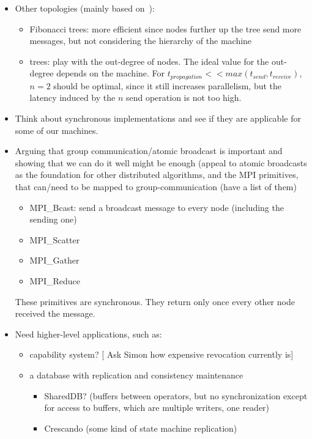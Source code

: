 \documentclass{article}
\newcommand{\stefan}[1]{
  {\color{skRed}[{\color{red}{SK}} #1]}}
\begin{document}
\begin{itemize}
\item Other topologies (mainly based on~\cite{Bruck1992}):
  \begin{itemize}
  \item Fibonacci trees: more efficient since nodes further up the
    tree send more messages, but not considering the hierarchy of the
    machine 
  \item \nary trees: play with the out-degree of nodes. The ideal
    value for the out-degree depends on the machine. For
    $t_{propagation} << max(t_{send}, t_{receive})$, $n = 2$ should be
    optimal, since it still increases parallelism, but the latency
    induced by the $n$ send operation is not too high.
  \end{itemize}
\item Think about synchronous implementations and see if they are
  applicable for some of our machines.
\item Arguing that group communication/atomic broadcast is important
  and showing that we can do it well might be enough (appeal to atomic
  broadcasts as the foundation for other distributed algorithms, and
  the MPI primitives, that can/need to be mapped to
  group-communication (have a list of them)
  \begin{itemize}
  \item MPI\_Bcast: send a broadcast message to every node (including
    the sending one)
  \item MPI\_Scatter
  \item MPI\_Gather
  \item MPI\_Reduce
  \end{itemize}
  These primitives are synchronous. They return only once every other
  node received the message. 
\item Need higher-level applications, such as:
  \begin{itemize}
  \item capability system? \stefan{Ask Simon how expensive revocation
      currently is}
  \item a database with replication and consistency maintenance
    \begin{itemize}
    \item SharedDB? (buffers between operators, but no synchronization
      except for access to buffers, which are multiple writers, one
      reader)
    \item Crescando (some kind of state machine replication)
    \end{itemize}

\end{itemize}
\end{itemize}
\end{document}
